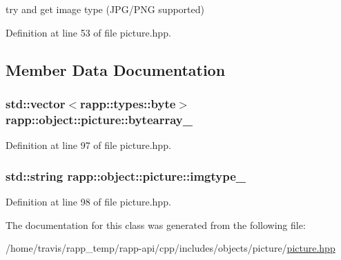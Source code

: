 try and get image type (J\-P\-G/\-P\-N\-G supported) 



Definition at line 53 of file picture.\-hpp.



\subsection{Member Data Documentation}
\hypertarget{classrapp_1_1object_1_1picture_a4c6377918f2286dbbe320cd9a1d8767c}{
\subsubsection[{bytearray\-\_\-}]{\setlength{\rightskip}{0pt plus 5cm}std\-::vector$<${\bf rapp\-::types\-::byte}$>$ rapp\-::object\-::picture\-::bytearray\-\_\-\hspace{0.3cm}{\ttfamily [private]}}}\label{classrapp_1_1object_1_1picture_a4c6377918f2286dbbe320cd9a1d8767c}


Definition at line 97 of file picture.\-hpp.

\hypertarget{classrapp_1_1object_1_1picture_abd57377c1e24ac9bfeda846bb3076aae}{
\subsubsection[{imgtype\-\_\-}]{\setlength{\rightskip}{0pt plus 5cm}std\-::string rapp\-::object\-::picture\-::imgtype\-\_\-\hspace{0.3cm}{\ttfamily [private]}}}\label{classrapp_1_1object_1_1picture_abd57377c1e24ac9bfeda846bb3076aae}


Definition at line 98 of file picture.\-hpp.



The documentation for this class was generated from the following file\-:\begin{DoxyCompactItemize}
\item 
/home/travis/rapp\-\_\-temp/rapp-\/api/cpp/includes/objects/picture/\hyperlink{picture_8hpp}{picture.\-hpp}\end{DoxyCompactItemize}
